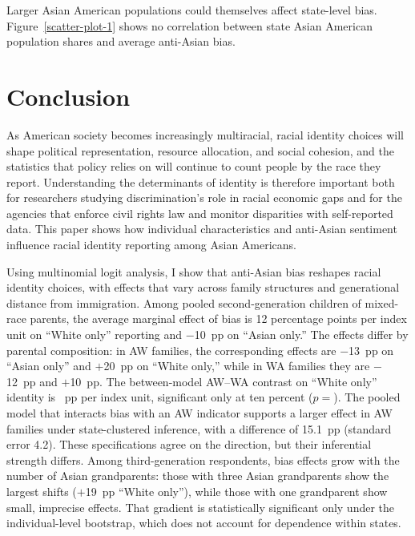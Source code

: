 Larger Asian American populations could themselves affect state-level bias. Figure~\ref{scatter-plot-1} shows no correlation between state Asian American population shares and average anti-Asian bias.

\section{Conclusion}\label{sec:conc}

As American society becomes increasingly multiracial, racial identity choices will shape political representation, resource allocation, and social cohesion, and the statistics that policy relies on will continue to count people by the race they report. Understanding the determinants of identity is therefore important both for researchers studying discrimination's role in racial economic gaps and for the agencies that enforce civil rights law and monitor disparities with self-reported data. This paper shows how individual characteristics and anti-Asian sentiment influence racial identity reporting among Asian Americans.
 
Using multinomial logit analysis, I show that anti-Asian bias reshapes racial identity choices, with effects that vary across family structures and generational distance from immigration. Among pooled second-generation children of mixed-race parents, the average marginal effect of bias is 12 percentage points per index unit on ``White only'' reporting and $-$10~pp on ``Asian only.'' The effects differ by parental composition: in AW families, the corresponding effects are $-$13~pp on ``Asian only'' and $+$20~pp on ``White only,'' while in WA families they are $-$12~pp and $+$10~pp. The between-model AW--WA contrast on ``White only'' identity is ~pp per index unit, significant only at ten percent ($p = $). The pooled model that interacts bias with an AW indicator supports a larger effect in AW families under state-clustered inference, with a difference of 15.1~pp (standard error 4.2). These specifications agree on the direction, but their inferential strength differs. Among third-generation respondents, bias effects grow with the number of Asian grandparents: those with three Asian grandparents show the largest shifts ($+$19~pp ``White only''), while those with one grandparent show small, imprecise effects. That gradient is statistically significant only under the individual-level bootstrap, which does not account for dependence within states.
 
